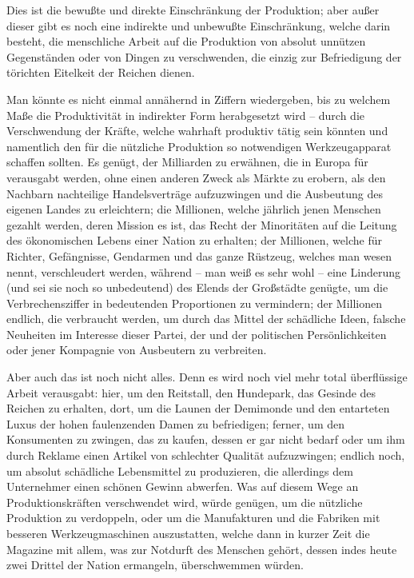 \documentclass{scrbook}
\begin{document}
Dies ist die bewußte und direkte Einschränkung der Produktion; aber außer dieser gibt es noch eine indirekte und unbewußte Einschränkung, welche darin besteht, die menschliche Arbeit auf die Produktion von absolut unnützen Gegenständen oder von Dingen zu verschwenden, die einzig zur Befriedigung der törichten Eitelkeit der Reichen dienen.

Man könnte es nicht einmal annähernd in Ziffern wiedergeben, bis zu welchem Maße die Produktivität in indirekter Form herabgesetzt wird – durch die Verschwendung der Kräfte, welche wahrhaft produktiv tätig sein könnten und namentlich den für die nützliche Produktion so notwendigen Werkzeugapparat schaffen sollten. Es genügt, der Milliarden zu erwähnen, die in Europa für  verausgabt werden, ohne einen anderen Zweck als Märkte zu erobern, als den Nachbarn nachteilige Handelsverträge aufzuzwingen und die Ausbeutung des eigenen Landes zu erleichtern; die Millionen, welche jährlich jenen Menschen gezahlt werden, deren Mission es ist, das Recht der Minoritäten auf die Leitung des ökonomischen Lebens einer Nation zu erhalten; der Millionen, welche für Richter, Gefängnisse, Gendarmen und das ganze Rüstzeug, welches man wesen nennt, verschleudert werden, während – man weiß es sehr wohl – eine Linderung (und sei sie noch so unbedeutend) des Elends der Großstädte genügte, um die Verbrechensziffer in bedeutenden Proportionen zu vermindern; der Millionen endlich, die verbraucht werden, um durch das Mittel der  schädliche Ideen, falsche Neuheiten im Interesse dieser Partei, der und der politischen Persönlichkeiten oder jener Kompagnie von Ausbeutern zu verbreiten.

Aber auch das ist noch nicht alles. Denn es wird noch viel mehr total überflüssige Arbeit verausgabt: hier, um den Reitstall, den Hundepark, das Gesinde des Reichen zu erhalten, dort, um die Launen der Demimonde und den entarteten Luxus der hohen faulenzenden Damen zu befriedigen; ferner, um den Konsumenten zu zwingen, das zu kaufen, dessen er gar nicht bedarf oder um ihm durch Reklame einen Artikel von schlechter Qualität aufzuzwingen; endlich noch, um absolut schädliche Lebensmittel zu produzieren, die allerdings dem Unternehmer einen schönen Gewinn abwerfen. Was auf diesem Wege an Produktionskräften verschwendet wird, würde genügen, um die nützliche Produktion zu verdoppeln, oder um die Manufakturen und die Fabriken mit besseren Werkzeugmaschinen auszustatten, welche dann in kurzer Zeit die Magazine mit allem, was zur Notdurft des Menschen gehört, dessen indes heute zwei Drittel der Nation ermangeln, überschwemmen würden.
\end{document}
